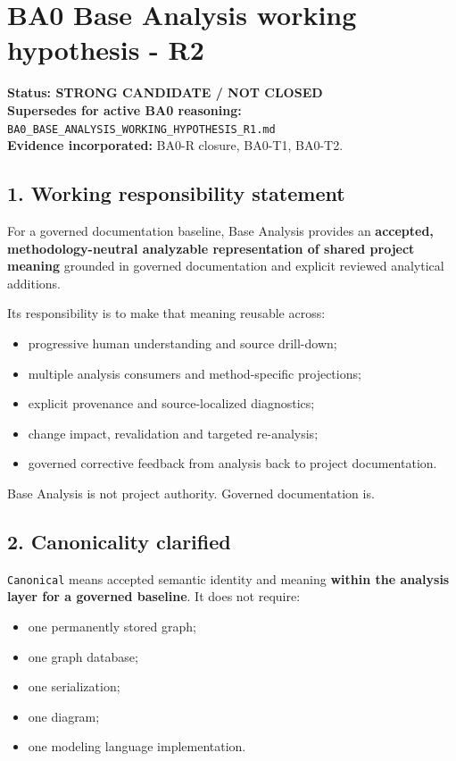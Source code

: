 \documentclass[
  10pt,
  a4paper,
]{article}
\author{}
\date{}
\providecommand{\tightlist}{%
  \setlength{\itemsep}{0pt}\setlength{\parskip}{0pt}}
\begin{document}
\section{BA0 Base Analysis working hypothesis -
R2}\label{ba0-base-analysis-working-hypothesis---r2}

\textbf{Status: STRONG CANDIDATE / NOT CLOSED}\\
\textbf{Supersedes for active BA0 reasoning:}
\texttt{BA0\_BASE\_ANALYSIS\_WORKING\_HYPOTHESIS\_R1.md}\\
\textbf{Evidence incorporated:} BA0-R closure, BA0-T1, BA0-T2.

\subsection{1. Working responsibility
statement}\label{1-working-responsibility-statement}

For a governed documentation baseline, Base Analysis provides an
\textbf{accepted, methodology-neutral analyzable representation of
shared project meaning} grounded in governed documentation and explicit
reviewed analytical additions.

Its responsibility is to make that meaning reusable across:

\begin{itemize}
\tightlist
\item
  progressive human understanding and source drill-down;
\item
  multiple analysis consumers and method-specific projections;
\item
  explicit provenance and source-localized diagnostics;
\item
  change impact, revalidation and targeted re-analysis;
\item
  governed corrective feedback from analysis back to project
  documentation.
\end{itemize}

Base Analysis is not project authority. Governed documentation is.

\subsection{2. Canonicality clarified}\label{2-canonicality-clarified}

\texttt{Canonical} means accepted semantic identity and meaning
\textbf{within the analysis layer for a governed baseline}. It does not
require:

\begin{itemize}
\tightlist
\item
  one permanently stored graph;
\item
  one graph database;
\item
  one serialization;
\item
  one diagram;
\item
  one modeling language implementation.
\end{itemize}
\end{document}

